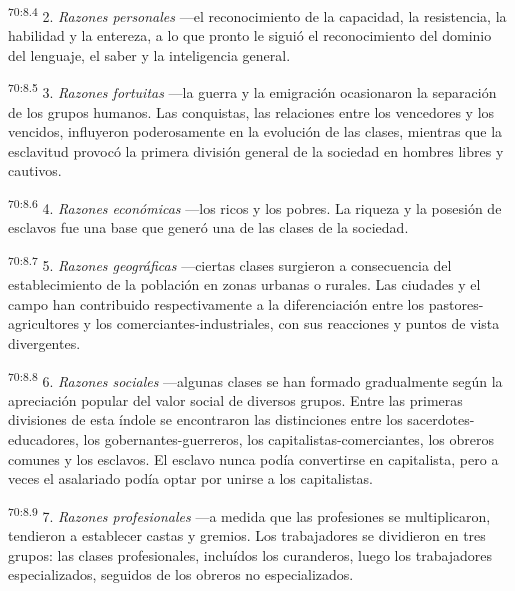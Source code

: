 \par
\textsuperscript{70:8.4} 2. \textit{Razones personales} ---el reconocimiento de la capacidad, la resistencia, la habilidad y la entereza, a lo que pronto le siguió el reconocimiento del dominio del lenguaje, el saber y la inteligencia general.

\par
\textsuperscript{70:8.5} 3. \textit{Razones fortuitas} ---la guerra y la emigración ocasionaron la separación de los grupos humanos. Las conquistas, las relaciones entre los vencedores y los vencidos, influyeron poderosamente en la evolución de las clases, mientras que la esclavitud provocó la primera división general de la sociedad en hombres libres y cautivos.

\par
\textsuperscript{70:8.6} 4. \textit{Razones económicas} ---los ricos y los pobres. La riqueza y la posesión de esclavos fue una base que generó una de las clases de la sociedad.

\par
\textsuperscript{70:8.7} 5. \textit{Razones geográficas} ---ciertas clases surgieron a consecuencia del establecimiento de la población en zonas urbanas o rurales. Las ciudades y el campo han contribuido respectivamente a la diferenciación entre los pastores-agricultores y los comerciantes-industriales, con sus reacciones y puntos de vista divergentes.

\par
\textsuperscript{70:8.8} 6. \textit{Razones sociales} ---algunas clases se han formado gradualmente según la apreciación popular del valor social de diversos grupos. Entre las primeras divisiones de esta índole se encontraron las distinciones entre los sacerdotes-educadores, los gobernantes-guerreros, los capitalistas-comerciantes, los obreros comunes y los esclavos. El esclavo nunca podía convertirse en capitalista, pero a veces el asalariado podía optar por unirse a los capitalistas.

\par
\textsuperscript{70:8.9} 7. \textit{Razones profesionales} ---a medida que las profesiones se multiplicaron, tendieron a establecer castas y gremios. Los trabajadores se dividieron en tres grupos: las clases profesionales, incluídos los curanderos, luego los trabajadores especializados, seguidos de los obreros no especializados.

